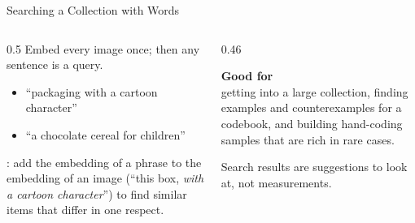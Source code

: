 \begin{frame}{Searching a Collection with Words}
\begin{columns}[T]
\begin{column}{0.5\textwidth}
Embed every image once; then any sentence is a query.

\vspace{0.15cm}
\begin{itemize}
\item ``packaging with a cartoon character''
\item ``a chocolate cereal for children''
\end{itemize}

\vspace{0.15cm}
: add the embedding of a phrase to the embedding of an image (``this box,
\emph{with a cartoon character}'') to find similar items that differ in one respect.
\end{column}
\begin{column}{0.46\textwidth}
\begin{graybox}
\textbf{Good for}\\
getting into a large collection, finding examples and counterexamples for a codebook, and
building hand-coding samples that are rich in rare cases.
\end{graybox}
\begin{warnbox}
Search results are suggestions to look at, not measurements.
\end{warnbox}
\end{column}
\end{columns}
\end{frame}


